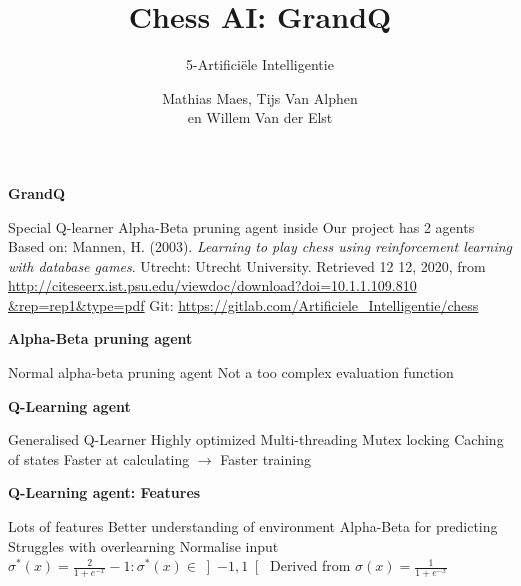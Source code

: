 \documentclass[compress]{beamer}
\title{Chess AI: GrandQ}
\subtitle{5-Artificiële Intelligentie}
\author{Mathias Maes, Tijs Van Alphen\\ en Willem Van der Elst}
\newcommand{\slidetitle}[1]{\textbf{\Large{#1}}\vspace{5mm}}
\begin{document}
\maketitle

\begin{frame}
    \slidetitle{GrandQ}
    \begin{outline}
        \1 Special Q-learner
            \2 Alpha-Beta pruning agent inside
        \1 Our project has 2 agents
        \1 Based on:
            \2 Mannen, H. (2003). \textit{Learning to play chess using reinforcement learning with database games}. Utrecht: Utrecht University. Retrieved 12 12, 2020, from \href{http://citeseerx.ist.psu.edu/viewdoc/download?doi=10.1.1.109.810&rep=rep1&type=pdf}{http://citeseerx.ist.psu.edu/viewdoc/download?doi=10.1.1.109.810\\\&rep=rep1\&type=pdf}
            \1 Git: \href{https://gitlab.com/Artificiele_Intelligentie/chess}{https://gitlab.com/Artificiele\_Intelligentie/chess}
    \end{outline}

\end{frame}

\begin{frame}
    \slidetitle{Alpha-Beta pruning agent}

    \begin{outline}
        \1 Normal alpha-beta pruning agent
        \1 Not a too complex evaluation function
    \end{outline}
\end{frame}

\begin{frame}
    \slidetitle{Q-Learning agent}
    \begin{outline}
        \1 Generalised Q-Learner
        \1 Highly optimized
            \2 Multi-threading
                \3 Mutex locking
            \2 Caching of states
        \1 Faster at calculating $\rightarrow$ Faster training
    \end{outline}
\end{frame}

\begin{frame}
    \slidetitle{Q-Learning agent: Features}
    \begin{outline}
        \1 Lots of features
            \2 Better understanding of environment
            \2 Alpha-Beta for predicting
        \1 Struggles with overlearning
            \2 Normalise input
            \2 $\sigma^*(x) = \frac{2}{1 + e^{-x}} -1: \sigma^*(x) \in \left]-1, 1\right[ $ 
            \3 Derived from $\sigma(x) = \frac{1}{1+e^{-x}}$
    \end{outline}
\end{frame}
\end{document}
